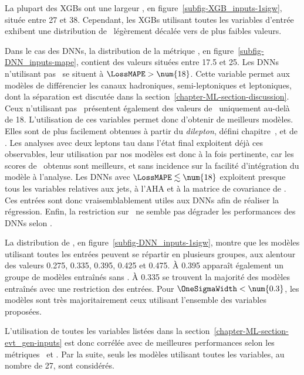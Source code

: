 \par
La plupart des XGBs ont
une largeur \OneSigmaWidth, en figure~\ref{subfig-XGB_inputs-1sigw},
située entre \num{27} et \num{38}.
Cependant,
les XGBs utilisant toutes les variables d'entrée
exhibent une distribution de \OneSigmaWidth\ légèrement décalée vers de plus faibles valeurs.
\par
Dans le cas des DNNs,
la distribution de la métrique \LossMAPE, en figure~\ref{subfig-DNN_inputs-mape},
contient des valeurs situées entre \num{17.5} et \num{25}.
Les DNNs n'utilisant pas \Nnu\
se situent à $\LossMAPE>\num{18}$.
Cette variable permet aux modèles de différencier les canaux
hadroniques, semi-leptoniques et leptoniques,
dont la séparation est discutée dans la section~\ref{chapter-ML-section-discussion}.
Ceux n'utilisant pas \mT\ présentent également des valeurs de \LossMAPE\ uniquement au-delà de \num{18}.
L'utilisation de ces variables permet donc d'obtenir de meilleurs modèles.
Elles sont de plus facilement obtenues à partir du \emph{dilepton}, défini chapitre~, et de \MET.
Les analyses avec deux leptons tau dans l'état final exploitent déjà ces observables,
leur utilisation par nos modèles est donc à la fois
pertinente, car les scores de \LossMAPE\ obtenus sont meilleurs,
et
sans incidence sur la facilité d'intégration du modèle à l'analyse.
Les DNNs avec $\LossMAPE\lesssim\num{18}$
exploitent presque tous
les variables relatives aux jets, à l'AHA et à la matrice de covariance de \MET.
Ces entrées sont donc vraisemblablement utiles aux DNNs afin de réaliser la régression.
Enfin,
la restriction sur \Npu\
ne semble pas dégrader les performances des DNNs
selon \LossMAPE.
\par
La distribution de
\OneSigmaWidth, en figure~\ref{subfig-DNN_inputs-1sigw},
montre que les modèles utilisant toutes les entrées peuvent se répartir en plusieurs groupes,
aux alentour des valeurs
\num{0.275}, \num{0.335}, \num{0.395}, \num{0.425} et \num{0.475}.
À \num{0.395} apparaît également un groupe de modèles entraînés sans \mT.
À \num{0.335} se trouvent la majorité des modèles entraînés avec une restriction des entrées.
Pour $\OneSigmaWidth<\num{0.3}$, les modèles sont très majoritairement ceux utilisant l'ensemble des variables proposées.
\par
L'utilisation de toutes les variables listées dans la section~\ref{chapter-ML-section-evt_gen-inputs}
est donc corrélée avec de meilleures performances
selon les métriques
\LossMAPE\
et
\OneSigmaWidth.
Par la suite, seuls les modèles utilisant toutes les variables, au nombre de 27, sont considérés.
